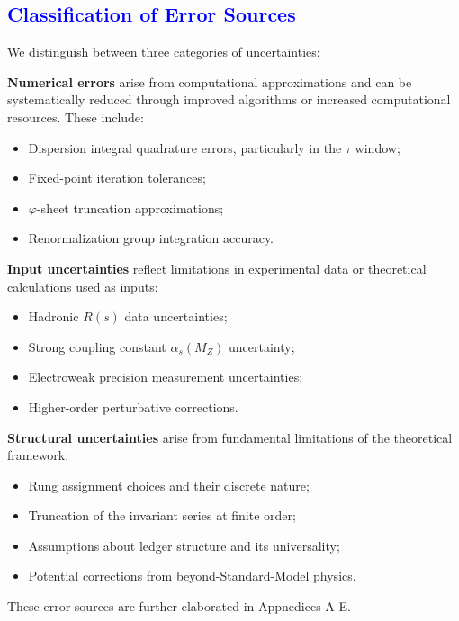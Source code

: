 \documentclass[%
amsmath,amssymb,
aps,
prb,
floatfix, showkeys, 10pt,
]{revtex4-2}
\newcommand{\modif}[1]{\textcolor{blue}{#1}}
\begin{document}
{\modif{ \subsection{Classification of Error Sources}  }}
We distinguish between three categories of uncertainties:

\textbf{Numerical errors} arise from computational approximations and can be systematically reduced through improved algorithms or increased computational resources. These include:
\begin{itemize}
\item Dispersion integral quadrature errors, particularly in the $\tau$ window;
\item Fixed-point iteration tolerances;
\item $\varphi$-sheet truncation approximations;
\item Renormalization group integration accuracy.
\end{itemize}

\textbf{Input uncertainties} reflect limitations in experimental data or theoretical calculations used as inputs:
\begin{itemize}
\item Hadronic $R(s)$ data uncertainties;
\item Strong coupling constant $\alpha_s(M_Z)$ uncertainty;
\item Electroweak precision measurement uncertainties;
\item Higher-order perturbative corrections.
\end{itemize}

\textbf{Structural uncertainties} arise from fundamental limitations of the theoretical framework:
\begin{itemize}
\item Rung assignment choices and their discrete nature;
\item Truncation of the invariant series at finite order;
\item Assumptions about ledger structure and its universality;
\item Potential corrections from beyond-Standard-Model physics.
\end{itemize}






These error sources are further elaborated in Appnedices A-E.
\end{document}
